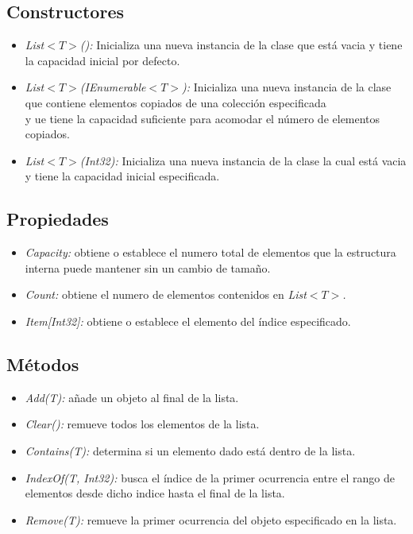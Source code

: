 \documentclass[letterpaper, 12pt]{article}
\begin{document}
\begin{justify}
            \subsection{Constructores}
            \begin{itemize}
                \item \emph{List\(<\!T\!>\)(): }Inicializa una nueva instancia de la clase que está vacia y tiene la capacidad inicial por defecto.
                \item \emph{List\(<\!T\!>\)(IEnumerable\(<\!T\!>\)): }Inicializa una nueva instancia de la clase que contiene elementos copiados de una colección especificada\\
                y ue tiene la capacidad suficiente para acomodar el número de elementos copiados.
                \item \emph{List\(<\!T\!>\)(Int32): }Inicializa una nueva instancia de la clase la cual está vacia y tiene la capacidad inicial especificada.
            \end{itemize}
            \subsection{Propiedades}
            \begin{itemize}
                \item \emph{Capacity: }obtiene o establece el numero total de elementos que la estructura interna puede mantener sin un cambio de tamaño.
                \item \emph{Count: }obtiene el numero de elementos contenidos en \emph{List\(<\!T\!>\).}
                \item \emph{Item[Int32]: }obtiene o establece el elemento del índice especificado.
            \end{itemize}
            \subsection{Métodos}
            \begin{itemize}
                \item \emph{Add(T): }añade un objeto al final de la lista.
                \item \emph{Clear(): }remueve todos los elementos de la lista.
                \item \emph{Contains(T): }determina si un elemento dado está dentro de la lista.
                \item \emph{IndexOf(T, Int32): }busca el índice de la primer ocurrencia entre el rango de elementos desde dicho indice hasta el final de la lista.
                \item \emph{Remove(T): }remueve la primer ocurrencia del objeto especificado en la lista. 
            \end{itemize}

\end{justify}
\end{document}
